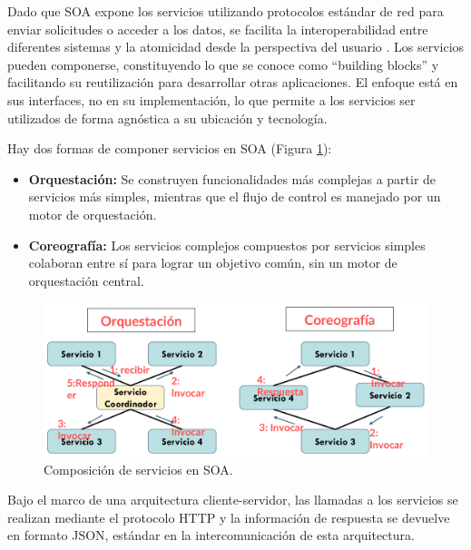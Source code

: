 Dado que SOA expone los servicios utilizando protocolos estándar de red para enviar solicitudes o acceder a los datos, se facilita la interoperabilidad entre diferentes sistemas y la atomicidad desde la perspectiva del usuario \cite{laskey2009service, 1210138}. Los servicios pueden componerse, constituyendo lo que se conoce como ``building blocks'' y facilitando su reutilización para desarrollar otras aplicaciones. El enfoque está en sus interfaces, no en su implementación, lo que permite a los servicios ser utilizados de forma agnóstica a su ubicación y tecnología.\newline

Hay dos formas de componer servicios en SOA (Figura \ref{fig:soa_composition}):

\begin{itemize}
    \item \textbf{Orquestación:} Se construyen funcionalidades más complejas a partir de servicios más simples, mientras que el flujo de control es manejado por un motor de orquestación.
    \item \textbf{Coreografía:} Los servicios complejos compuestos por servicios simples colaboran entre sí para lograr un objetivo común, sin un motor de orquestación central.
\end{itemize}

\begin{figure}[H]
    \centering
    \includegraphics[width=1\textwidth]{./imagenes/Orquestacion_y_coreografia.png}
    \caption{Composición de servicios en SOA.}
    \label{fig:soa_composition}
\end{figure}

Bajo el marco de una arquitectura cliente-servidor, las llamadas a los servicios se realizan mediante el protocolo HTTP y la información de respuesta se devuelve en formato JSON, estándar en la intercomunicación de esta arquitectura.\newline


